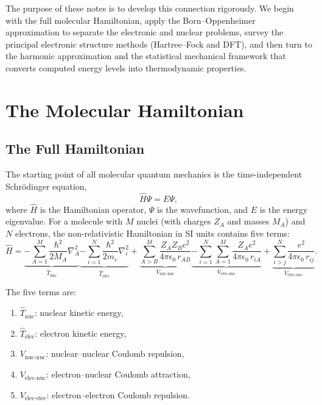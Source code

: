 \documentclass[11pt]{article}
\numberwithin{equation}{section}
\begin{document}
The purpose of these notes is to develop this connection rigorously. We begin with the full molecular Hamiltonian, apply the Born--Oppenheimer approximation to separate the electronic and nuclear problems, survey the principal electronic structure methods (Hartree--Fock and DFT), and then turn to the harmonic approximation and the statistical mechanical framework that converts computed energy levels into thermodynamic properties.


\section{The Molecular Hamiltonian}
\label{sec:hamiltonian}

\subsection{The Full Hamiltonian}

The starting point of all molecular quantum mechanics is the time-independent Schr\"{o}dinger equation,
\begin{equation}
\hat{H}\Psi = E\Psi,
\label{eq:schrodinger}
\end{equation}
where $\hat{H}$ is the Hamiltonian operator, $\Psi$ is the wavefunction, and $E$ is the energy eigenvalue. For a molecule with $M$ nuclei (with charges $Z_A$ and masses $M_A$) and $N$ electrons, the non-relativistic Hamiltonian in SI units contains five terms:
\begin{equation}
\hat{H} = \underbrace{-\sum_{A=1}^{M}\frac{\hbar^2}{2M_A}\nabla_A^2}_{\hat{T}_\text{nuc}}
\underbrace{- \sum_{i=1}^{N}\frac{\hbar^2}{2m_e}\nabla_i^2}_{\hat{T}_\text{elec}}
+ \underbrace{\sum_{A>B}^{M}\frac{Z_A Z_B e^2}{4\pi\epsilon_0\, r_{AB}}}_{V_\text{nuc-nuc}}
\underbrace{- \sum_{i=1}^{N}\sum_{A=1}^{M}\frac{Z_A e^2}{4\pi\epsilon_0\, r_{iA}}}_{V_\text{elec-nuc}}
+ \underbrace{\sum_{i>j}^{N}\frac{e^2}{4\pi\epsilon_0\, r_{ij}}}_{V_\text{elec-elec}}.
\label{eq:full_hamiltonian}
\end{equation}

The five terms are:
\begin{enumerate}
\item $\hat{T}_\text{nuc}$: nuclear kinetic energy,
\item $\hat{T}_\text{elec}$: electron kinetic energy,
\item $V_\text{nuc-nuc}$: nuclear--nuclear Coulomb repulsion,
\item $V_\text{elec-nuc}$: electron--nuclear Coulomb attraction,
\item $V_\text{elec-elec}$: electron--electron Coulomb repulsion.
\end{enumerate}
\end{document}
